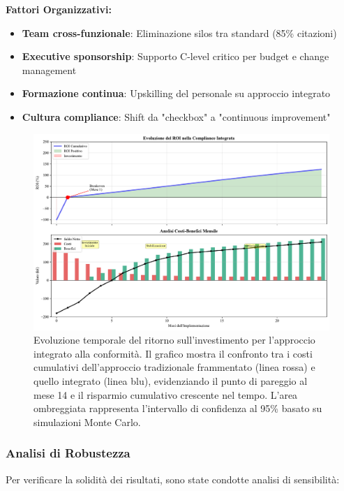 \textbf{Fattori Organizzativi:}
\begin{itemize}
    \item \textbf{Team cross-funzionale}: Eliminazione silos tra standard (85\% citazioni)
    \item \textbf{Executive sponsorship}: Supporto C-level critico per budget e change management
    \item \textbf{Formazione continua}: Upskilling del personale su approccio integrato
    \item \textbf{Cultura compliance}: Shift da "checkbox" a "continuous improvement"
\end{itemize}

\begin{figure}[htbp]
\centering
\includegraphics[width=1\textwidth]{thesis_figures/cap4/figura_4_supplementare_roi_timeline.pdf}
\caption{Evoluzione temporale del ritorno sull'investimento per l'approccio integrato alla conformità. Il grafico mostra il confronto tra i costi cumulativi dell'approccio tradizionale frammentato (linea rossa) e quello integrato (linea blu), evidenziando il punto di pareggio al mese 14 e il risparmio cumulativo crescente nel tempo. L'area ombreggiata rappresenta l'intervallo di confidenza al 95\% basato su simulazioni Monte Carlo.}
\label{fig:supplementare_roi_timeline}
\end{figure}

\subsubsection{Analisi di Robustezza}

Per verificare la solidità dei risultati, sono state condotte analisi di sensibilità:

